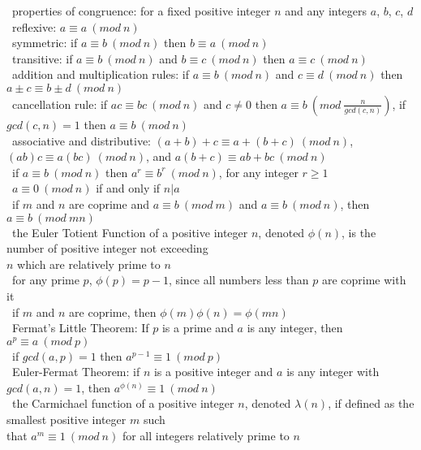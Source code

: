 \documentclass[10pt,letterpaper]{scrartcl}
\newcommand{\tbul}{\textbullet}
\newcommand{\tend}{\>\textendash}
\begin{document}
\begin{tabbing}
\tbul\ properties of congruence: for a fixed positive integer $n$ and any integers $a$, $b$, $c$, $d$ \\
    \tend\ reflexive: $a\equiv a\ (mod\ n)$ \\
    \tend\ symmetric: if $a\equiv b\ (mod\ n)$ then $b\equiv a\ (mod\ n)$ \\
    \tend\ transitive: if $a\equiv b\ (mod\ n)$ and $b\equiv c\ (mod\ n)$ then $a\equiv c\ (mod\ n)$\\
    \tend\ addition and multiplication rules: if $a\equiv b\ (mod\ n)$ and $c\equiv d\ (mod\ n)$ then $a\pm c\equiv b\pm d\ (mod\ n)$ \\
    \tend\ cancellation rule: if $ac\equiv bc\ (mod\ n)$ and $c\neq 0$ then $a\equiv b\ (mod\ \frac{n}{gcd(c,n)})$, if $gcd(c,n)=1$ then $a\equiv b\ (mod\ n)$\\
    \tend\ associative and distributive: $(a+b)+c\equiv a+(b+c)\ (mod\ n)$, $(ab)c\equiv a(bc)\ (mod\ n)$, and $a(b+c)\equiv ab+bc\ (mod\ n)$\\
    \tend\ if $a\equiv b\ (mod\ n)$ then $a^r\equiv b^r\ (mod\ n)$, for any integer $r\geq 1$\\
    \tend\ $a\equiv 0\ (mod\ n)$ if and only if $n|a$\\
\tbul\ if $m$ and $n$ are coprime and $a\equiv b\ (mod\ m)$ and $a\equiv b\ (mod\ n)$, then $a\equiv b\ (mod\ mn)$ \\
\tbul\ the Euler Totient Function of a positive integer $n$, denoted $\phi (n)$, is the number of positive integer not exceeding \\ $n$ which are relatively prime to $n$ \\
\tbul\ for any prime $p$, $\phi (p)=p-1$, since all numbers less than $p$ are coprime with it \\
\tbul\ if $m$ and $n$ are coprime, then $\phi (m)\phi (n)=\phi (mn)$ \\
\tbul\ Fermat's Little Theorem: If $p$ is a prime and $a$ is any integer, then $a^p\equiv a\ (mod\ p)$ \\
    \tend\ if $gcd(a, p)=1$ then $a^{p-1}\equiv 1\ (mod\ p)$ \\
\tbul\ Euler-Fermat Theorem: if $n$ is a positive integer and $a$ is any integer with $gcd(a,n)=1$, then $a^{\phi (n)}\equiv 1\ (mod\ n)$ \\
\tbul\ the Carmichael function of a positive integer $n$, denoted $\lambda (n)$, if defined as the smallest positive integer $m$ such \\ that $a^m\equiv 1\ (mod\ n)$ for all integers relatively prime to $n$ \\

\end{tabbing}
\end{document}
